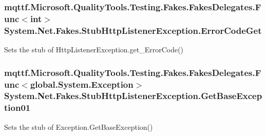 \hypertarget{class_system_1_1_net_1_1_fakes_1_1_stub_http_listener_exception_ac654e59004863eb65952dd2fde38d9b8}{
\subsubsection[{Error\-Code\-Get}]{\setlength{\rightskip}{0pt plus 5cm}mqttf.\-Microsoft.\-Quality\-Tools.\-Testing.\-Fakes.\-Fakes\-Delegates.\-Func$<$int$>$ System.\-Net.\-Fakes.\-Stub\-Http\-Listener\-Exception.\-Error\-Code\-Get}}\label{class_system_1_1_net_1_1_fakes_1_1_stub_http_listener_exception_ac654e59004863eb65952dd2fde38d9b8}


Sets the stub of Http\-Listener\-Exception.\-get\-\_\-\-Error\-Code()

\hypertarget{class_system_1_1_net_1_1_fakes_1_1_stub_http_listener_exception_a6b4826ad3861b16471149137b58f8fbe}{
\subsubsection[{Get\-Base\-Exception01}]{\setlength{\rightskip}{0pt plus 5cm}mqttf.\-Microsoft.\-Quality\-Tools.\-Testing.\-Fakes.\-Fakes\-Delegates.\-Func$<$global.\-System.\-Exception$>$ System.\-Net.\-Fakes.\-Stub\-Http\-Listener\-Exception.\-Get\-Base\-Exception01}}\label{class_system_1_1_net_1_1_fakes_1_1_stub_http_listener_exception_a6b4826ad3861b16471149137b58f8fbe}


Sets the stub of Exception.\-Get\-Base\-Exception()

